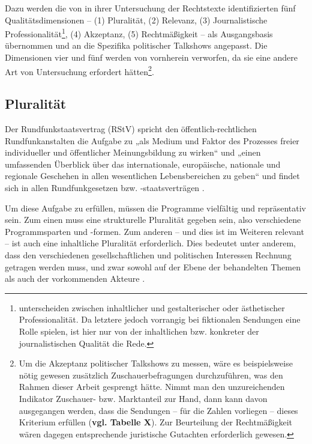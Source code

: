 Dazu werden die von \textcite[692f.]{schatzQualitaetFernsehprogrammenKriterien1992} in ihrer Untersuchung der Rechtstexte identifizierten fünf Qualitätsdimensionen – (1) Pluralität, (2) Relevanz, (3) Journalistische Professionalität\footnote{\textcite[702]{schatzQualitaetFernsehprogrammenKriterien1992} unterscheiden zwischen inhaltlicher und gestalterischer oder ästhetischer Professionalität. Da letztere jedoch vorrangig bei fiktionalen Sendungen eine Rolle spielen, ist hier nur von der inhaltlichen bzw. konkreter der journalistischen Qualität die Rede.}, (4) Akzeptanz, (5) Rechtmäßigkeit – als Ausgangsbasis übernommen und an die Spezifika politischer Talkshows angepasst. Die Dimensionen vier und fünf werden von vornherein verworfen, da sie eine andere Art von Untersuchung erfordert hätten\footnote{Um die Akzeptanz politischer Talkshows zu messen, wäre es beispielsweise nötig gewesen zusätzlich Zuschauerbefragungen durchzuführen, was den Rahmen dieser Arbeit gesprengt hätte. Nimmt man den unzureichenden Indikator Zuschauer- bzw. Marktanteil zur Hand, dann kann davon ausgegangen werden, dass die Sendungen – für die Zahlen vorliegen – dieses Kriterium erfüllen (\textbf{vgl. Tabelle X}). Zur Beurteilung der Rechtmäßigkeit wären dagegen entsprechende juristische Gutachten erforderlich gewesen.}.

\subsection{Pluralität}

Der Rundfunkstaatsvertrag (RStV) spricht den öffentlich-rechtlichen Rundfunkanstalten die Aufgabe zu „als Medium und Faktor des Prozesses freier individueller und öffentlicher Meinungsbildung zu wirken“ und „einen umfassenden Überblick über das internationale, europäische, nationale und regionale Geschehen in allen wesentlichen Lebensbereichen zu geben“ \parencite[§11 Abs. 1]{o.a.Rundfunkstaatsvertrag1991} und findet sich in allen Rundfunkgesetzen bzw. -staatsverträgen \parencite[693]{schatzQualitaetFernsehprogrammenKriterien1992}.

Um diese Aufgabe zu erfüllen, müssen die Programme vielfältig und repräsentativ sein. Zum einen muss eine strukturelle Pluralität gegeben sein, also verschiedene Programmsparten und -formen. Zum anderen – und dies ist im Weiteren relevant – ist auch eine inhaltliche Pluralität erforderlich. Dies bedeutet unter anderem, dass den verschiedenen gesellschaftlichen und politischen Interessen Rechnung getragen werden muss, und zwar sowohl auf der Ebene der behandelten Themen als auch der vorkommenden Akteure \parencite[693-695]{schatzQualitaetFernsehprogrammenKriterien1992}.

